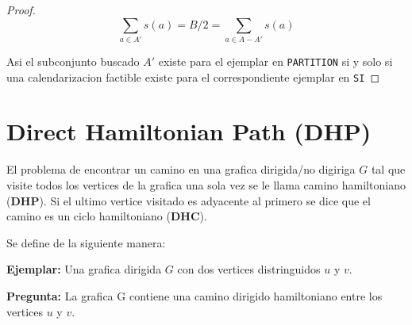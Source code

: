 \documentclass{article}
\begin{document}
\begin{proof}
  \begin{equation*}
    \sum_{a \in A'} s(a) = B / 2 = \sum_{a \in A - A'} s(a)
  \end{equation*}

  Asi el subconjunto buscado $A'$ existe para el ejemplar en \texttt{PARTITION} si y solo si una calendarizacion factible existe para el correspondiente ejemplar en \texttt{SI}
\end{proof}

\section{Direct Hamiltonian Path (DHP)}
El problema de encontrar un camino en una grafica dirigida/no digiriga $G$ tal que visite todos los vertices de la grafica una sola vez se le llama camino hamiltoniano (\textbf{DHP}). Si el ultimo vertice visitado es adyacente al primero se dice que el camino es un ciclo hamiltoniano (\textbf{DHC}).

Se define de la siguiente manera:

\textbf{Ejemplar:}
Una grafica dirigida $G$ con dos vertices distringuidos $u$ y $v$.

\textbf{Pregunta:}
La grafica G contiene una camino dirigido hamiltoniano entre los vertices $u$ y $v$.
\end{document}
